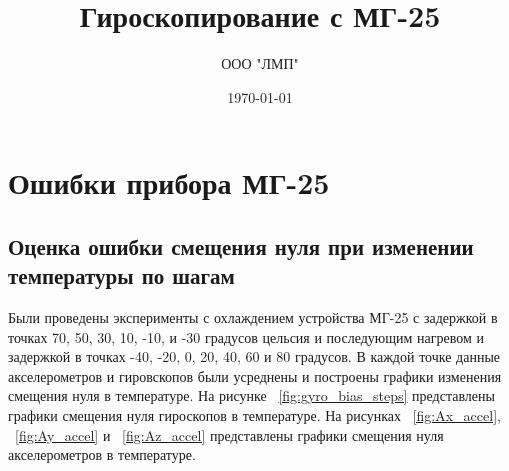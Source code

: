 \documentclass[a4paper,12pt]{article}
\author{ООО "ЛМП"} %
\title{Гироскопирование с МГ-25}  %
\date{\today} %
\begin{document}
\maketitle

\section{Ошибки прибора МГ-25}
\subsection{Оценка ошибки смещения нуля при изменении температуры по шагам}
Были проведены эксперименты с охлаждением устройства МГ-25 с задержкой в точках 70, 50, 30, 10, -10, и -30 градусов цельсия и последующим нагревом и задержкой в точках -40, -20, 0, 20, 40, 60 и 80 градусов. В каждой точке данные акселерометров и гировскопов были усреднены и построены графики изменения смещения нуля в температуре. На рисунке ~\ref{fig:gyro_bias_steps} представлены графики смещения нуля гироскопов в температуре. На рисунках ~\ref{fig:Ax_accel}, ~\ref{fig:Ay_accel} и ~\ref{fig:Az_accel} представлены графики смещения нуля акселерометров в температуре.
\end{document}
